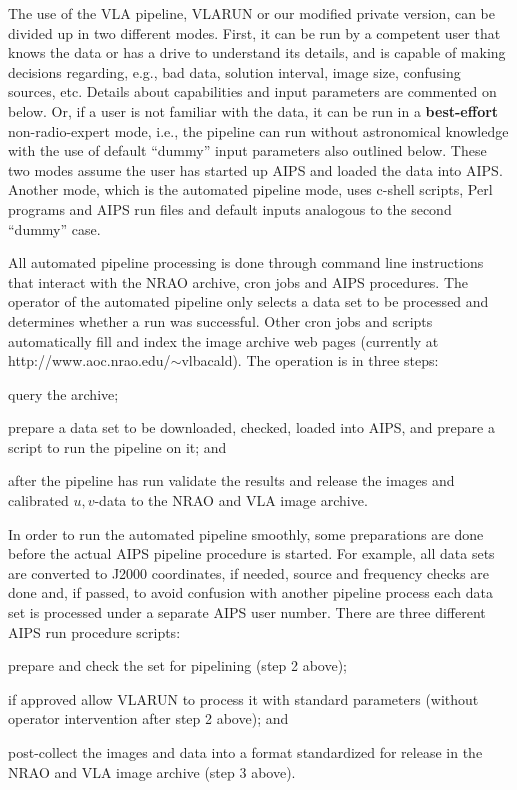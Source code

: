 The use of the VLA pipeline, VLARUN or our modified private version,
can be divided up in two different modes. First, it can be run by a
competent user that knows the data or has a drive to understand its
details, and is capable of making decisions regarding, e.g., bad data,
solution interval, image size, confusing sources, etc. Details about
capabilities and input parameters are commented on below. Or, if a
user is not familiar with the data, it can be run in a {\bfseries
best-effort} non-radio-expert mode, i.e., the pipeline can run without
astronomical knowledge with the use of default ``dummy'' input
parameters also outlined below. These two modes assume the user has
started up AIPS and loaded the data into AIPS. Another mode, which is
the automated pipeline mode, uses c-shell scripts, Perl programs and
AIPS run files and default inputs analogous to the second ``dummy'' case.

All automated pipeline processing is done through command line
instructions that interact with the NRAO archive, cron jobs and AIPS
procedures. The operator of the automated pipeline only selects a data
set to be processed and determines whether a run was successful. Other
cron jobs and scripts automatically fill and index the image archive
web pages (currently at http://www.aoc.nrao.edu/$\sim$vlbacald). The
operation is in three steps: 
\begin{list}{: }{}
\setlength{\baselineskip}{-1pt}\setlength{\parskip}{\baselineskip}
\item  query the archive;
\item prepare a data set to be downloaded, checked, loaded into AIPS,
and prepare a script to run the pipeline on it; and
\item after the pipeline has run validate the results and release the
images and calibrated $u,v$-data to the NRAO and VLA image archive.
\end{list}

In order to run the automated pipeline smoothly, some preparations are
done before the actual AIPS pipeline procedure is started. For
example, all data sets are converted to J2000 coordinates, if needed,
source and frequency checks are done and, if passed, to avoid confusion
with another pipeline process each data set is processed under a
separate AIPS user number. There are three different AIPS run
procedure scripts: 
\begin{list}{: }{}
\setlength{\baselineskip}{-1pt}\setlength{\parskip}{\baselineskip}
\item prepare and check the set for pipelining (step 2 above);
\item if approved allow VLARUN to process it with standard parameters
(without operator intervention after step 2 above); and
\item post-collect the images and data into a format standardized for
release in the NRAO and VLA image archive (step 3 above).
\end{list}

